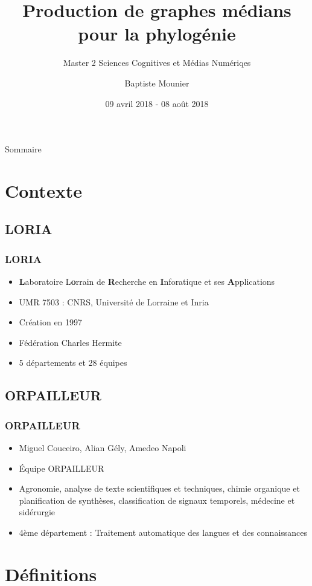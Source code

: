 \documentclass{beamer}
\title{Production de graphes médians pour la phylogénie}
\subtitle{Master 2 Sciences Cognitives et Médias Numériqes}
\author{Baptiste Mounier}
\institute{UFR Mathématiques et Informatique \and LORIA}
\date{09 avril 2018 - 08 août 2018}
\begin{document}
\begin{frame}[plain]
	\titlepage
\end{frame}

\begin{frame}{Sommaire}
	\tableofcontents[hideallsubsections]
\end{frame}


\section{Contexte}

\subsection{LORIA}

\begin{frame}
	\frametitle{LORIA}
	\begin{itemize}
		\item {\bf L}aboratoire L{\bf o}rrain de {\bf R}echerche en {\bf I}nforatique et ses {\bf A}pplications
		\item UMR 7503 : CNRS, Université de Lorraine et Inria
		\item Création en 1997
		\item Fédération Charles Hermite
		\item 5 départements et 28 équipes 
	\end{itemize}
\end{frame}

\subsection{ORPAILLEUR}
\begin{frame}
	\frametitle{ORPAILLEUR}
	\begin{itemize}
		\item Miguel Couceiro, Alian Gély, Amedeo Napoli
		\item Équipe ORPAILLEUR
		\item Agronomie, analyse de texte scientifiques et techniques, chimie organique et planification de synthèses, classification de signaux temporels, médecine et sidérurgie
		\item 4ème département : Traitement automatique des langues et des connaissances
	\end{itemize}
\end{frame}

\section{Définitions}
\end{document}
